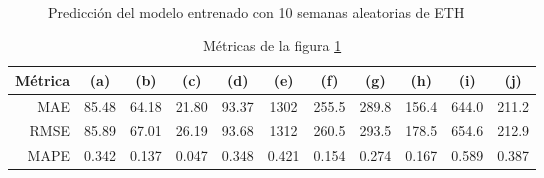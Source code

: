 \documentclass[a4paper,10pt]{article}
\begin{document}
\begin{figure}[H]
    \\
  \caption{Predicción del modelo entrenado con 10 semanas aleatorias de ETH}
  \label{f:eth_wk_prophet}
\end{figure}

\begin{table}[H]
 \begin{center}
 \resizebox{12cm}{!} {
  \begin{tabular}{|r|c|c|c|c|c|c|c|c|c|c|}
    Métrica & (a) & (b) & (c) & (d) & (e) & (f) & (g) & (h) & (i) & (j) \\ \hline
    MAE & 85.48& 64.18& 21.80& 93.37& 1302& 255.5& 289.8& 156.4& 644.0& 211.2\\
    RMSE & 85.89& 67.01& 26.19& 93.68& 1312& 260.5& 293.5& 178.5& 654.6& 212.9\\
    MAPE & 0.342& 0.137& 0.047& 0.348& 0.421& 0.154& 0.274& 0.167& 0.589& 0.387\\ \hline
  \end{tabular}
  }
  \caption{Métricas de la figura \ref{f:eth_wk_prophet}}
  \label{tab:eth_prophet_wk}
 \end{center}
\end{table}
\end{document}

